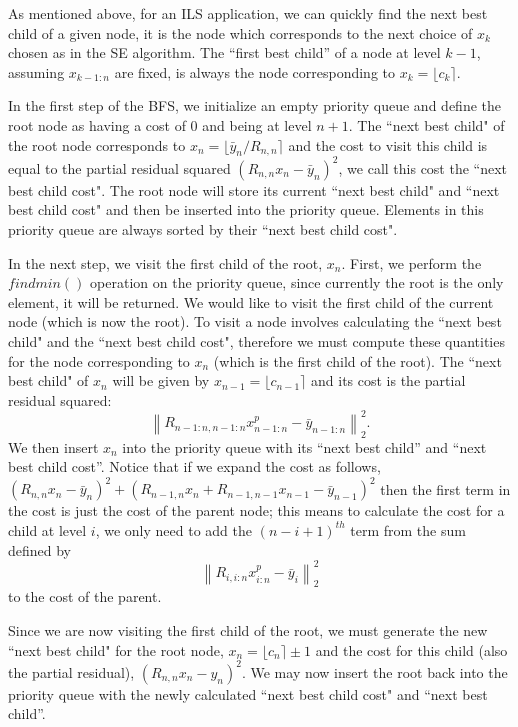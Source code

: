 \documentclass[12pt,Bold,letterpaper]{mcgilletdclass}
\begin{document}
As mentioned above, for an ILS application, we can quickly find the next best child of a given node, it is the node which corresponds to the next choice of $x_k$ chosen as in the SE algorithm. The ``first best child'' of a node at level $k-1$, assuming $x_{k-1:n}$ are fixed, is always the node corresponding to $x_k = \lfloor c_k \rceil$.

In the first step of the BFS, we initialize an empty priority queue and define the root node as having a cost of $0$ and being at level $n+1$. The ``next best child" of the root node corresponds to $x_n = \lfloor \bar{y}_n/R_{n,n} \rceil$ and the cost to visit this child is equal to the partial residual squared $(R_{n,n}x_n - \bar{y}_n)^2$, we call this cost the ``next best child cost". The root node will store its current ``next best child" and ``next best child cost" and then be inserted into the priority queue. Elements in this priority queue are always sorted by their ``next best child cost".

In the next step, we visit the first child of the root, $x_{n}$. First, we perform the $findmin()$ operation on the priority queue, since currently the root is the only element, it will be returned. We would like to visit the first child of the current node (which is now the root). To visit a node involves calculating the ``next best child" and the ``next best child cost", therefore we must compute these quantities for the node corresponding to $x_{n}$ (which is the first child of the root). The ``next best child" of $x_n$ will be given by $x_{n-1} = \lfloor c_{n-1} \rceil$ and its cost is the partial residual squared: $$\left \| R_{n-1:n,n-1:n}x_{n-1:n}^p - \bar{y}_{n-1:n}\right \|_2^2.$$ We then insert $x_n$ into the priority queue with its ``next best child'' and ``next best child cost''. Notice that if we expand the cost as follows, $(R_{n,n}x_n - \bar{y}_n)^2 + (R_{n-1,n}x_n + R_{n-1,n-1}x_{n-1} - \bar{y}_{n-1})^2$ then the first term in the cost is just the cost of the parent node; this means to calculate the cost for a child at level $i$, we only need to add the $(n-i+1)^{th}$ term from the sum defined by $$\left \| R_{i,i:n}x_{i:n}^p - \bar{y}_{i}\right \|_2^2$$ to the cost of the parent.

Since we are now visiting the first child of the root, we must generate the new ``next best child" for the root node, $x_n = \lfloor c_n \rceil \pm 1$ and the cost for this child (also the partial residual), $(R_{n,n}x_n - y_n)^2$. We may now insert the root back into the priority queue with the newly calculated ``next best child cost" and ``next best child''.
 
\end{document}
